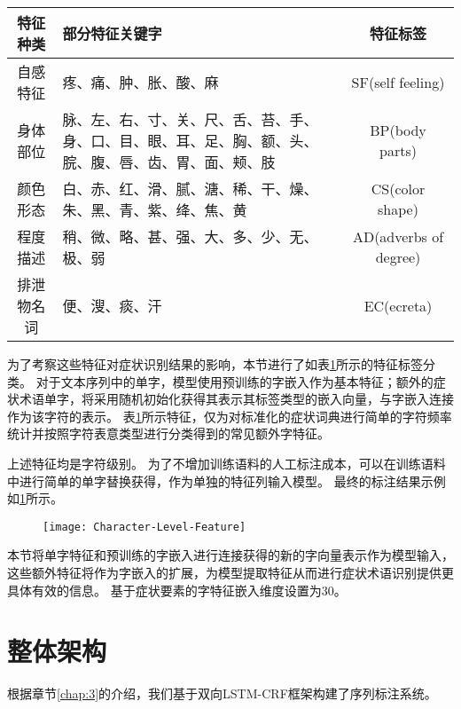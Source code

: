 \begin{table}[H]
    \centering
    \footnotesize
    \setlength{\tabcolsep}{4pt}
    \renewcommand{\arraystretch}{1.2}
    \begin{tabular}{cp{5cm}c}
        \toprule
        特征种类 & 部分特征关键字 & 特征标签\\
        \midrule
        自感特征 & 疼、痛、肿、胀、酸、麻 & SF(self feeling)\\
        \midrule
        身体部位 & 脉、左、右、寸、关、尺、舌、苔、手、身、口、目、眼、耳、足、胸、额、头、脘、腹、唇、齿、胃、面、颊、肢 & BP(body parts)\\
        \midrule
        颜色形态 & 白、赤、红、滑、腻、溏、稀、干、燥、朱、黑、青、紫、绛、焦、黄 & CS(color shape)\\
        \midrule
        程度描述 & 稍、微、略、甚、强、大、多、少、无、极、弱 & AD(adverbs of degree) \\
        \midrule
        排泄物名词 & 便、溲、痰、汗 & EC(ecreta)\\
        \bottomrule
    \end{tabular}
    \label{tab:symptom_cluster}
\end{table}
为了考察这些特征对症状识别结果的影响，本节进行了如表\ref{tab:symptom_cluster}所示的特征标签分类。
对于文本序列中的单字，模型使用预训练的字嵌入作为基本特征；额外的症状术语单字，将采用随机初始化获得其表示其标签类型的嵌入向量，与字嵌入连接作为该字符的表示。
表\ref{tab:symptom_cluster}所示特征，仅为对标准化的症状词典进行简单的字符频率统计并按照字符表意类型进行分类得到的常见额外字特征。

上述特征均是字符级别。
为了不增加训练语料的人工标注成本，可以在训练语料中进行简单的单字替换获得，作为单独的特征列输入模型。
最终的标注结果示例如\ref{fig:character_level_feature}所示。
\begin{figure}[H]
    \centering
    \texttt{[image: Character-Level-Feature]}
    \label{fig:character_level_feature}
\end{figure}

本节将单字特征和预训练的字嵌入进行连接获得的新的字向量表示作为模型输入，这些额外特征将作为字嵌入的扩展，为模型提取特征从而进行症状术语识别提供更具体有效的信息。
基于症状要素的字特征嵌入维度设置为30。

\section{整体架构}
根据章节\ref{chap:3}的介绍，我们基于双向LSTM-CRF框架构建了序列标注系统。

